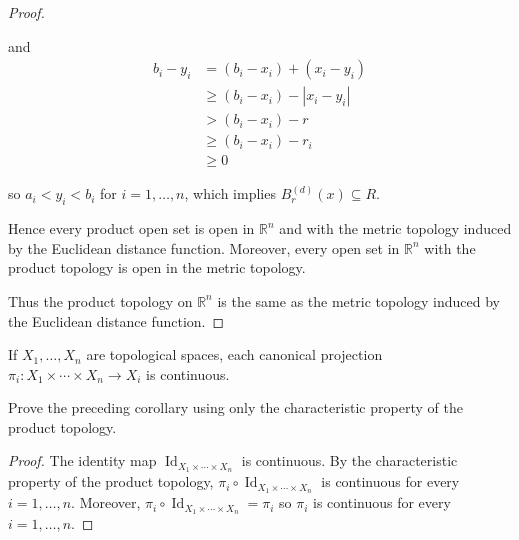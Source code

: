 \begin{proof}
\begin{itemize}
              and
              \begin{align*}
                  b_{i} - y_{i} & = (b_{i} - x_{i}) + (x_{i} - y_{i})                         \\
                                & \geq (b_{i} - x_{i}) - \left\vert{x_{i} - y_{i}}\right\vert \\
                                & > (b_{i} - x_{i}) - r                                       \\
                                & \geq (b_{i} - x_{i}) - r_{i}                                \\
                                & \geq 0
              \end{align*}

              so $a_{i} < y_{i} < b_{i}$ for $i = 1,\ldots, n$, which implies $B^{(d)}_{r}(x)\subseteq R$.

              Hence every product open set is open in $\mathbb{R}^{n}$ and with the metric topology induced by the Euclidean distance function. Moreover, every open set in $\mathbb{R}^{n}$ with the product topology is open in the metric topology.
    \end{itemize}

    Thus the product topology on $\mathbb{R}^{n}$ is the same as the metric topology induced by the Euclidean distance function.
\end{proof}

\begin{exercise}{3.29}
    If $X_{1}, \ldots, X_{n}$ are topological spaces, each canonical projection $\pi_{i}: X_{1}\times\cdots\times X_{n}\to X_{i}$ is continuous.

    Prove the preceding corollary using only the characteristic property of the product topology.
\end{exercise}

\begin{proof}
    The identity map $\operatorname{Id}_{X_{1}\times\cdots\times X_{n}}$ is continuous. By the characteristic property of the product topology, $\pi_{i}\circ \operatorname{Id}_{X_{1}\times\cdots\times X_{n}}$ is continuous for every $i = 1,\ldots, n$. Moreover, $\pi_{i}\circ \operatorname{Id}_{X_{1}\times\cdots\times X_{n}} = \pi_{i}$ so $\pi_{i}$ is continuous for every $i = 1,\ldots,n$.
\end{proof}

